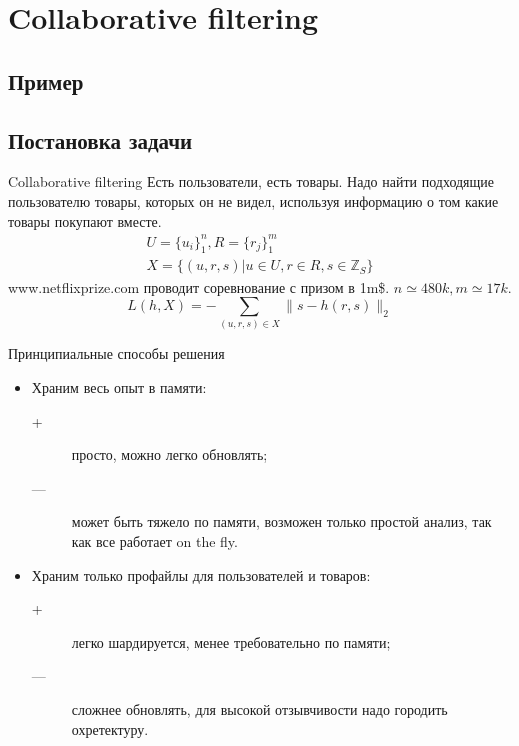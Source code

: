 \documentclass[14pt, fleqn, xcolor={dvipsnames, table}]{beamer}
\begin{document}
\section{Collaborative filtering}

\subsection{Пример}

\subsection{Постановка задачи} %
\begin{frame}{Collaborative filtering}
Есть пользователи, есть товары. Надо найти подходящие пользователю товары, которых он не видел, используя информацию о том какие товары покупают вместе.
$$\begin{array}{l}
U = \{u_i\}_1^n, R = \{r_j\}_1^m \\
X = \{(u, r, s) | u \in U, r \in R, s \in \mathbb{Z}_S \}
\end{array}$$
{\color{blue}www.netflixprize.com} проводит соревнование с призом в 1m\$. $n \simeq 480k, m \simeq 17k$.
$$
L(h, X) = -\sum_{(u,r,s) \in X} \|s - h(r,s)\|_2
$$
\end{frame}

\begin{frame}{Принципиальные способы решения}
\begin{itemize}
  \item Храним весь опыт в памяти:
  \begin{description}
    \item[\color{green}+] просто, можно легко обновлять;
    \item[\color{red}---] может быть тяжело по памяти, возможен только простой анализ, так как все работает on the fly.
  \end{description}
  \item Храним только профайлы для пользователей и товаров:
  \begin{description}
    \item[\color{green}+] легко шардируется, менее требовательно по памяти;
    \item[\color{red}---] сложнее обновлять, для высокой отзывчивости надо городить охретектуру.
  \end{description}
\end{itemize}
\end{frame}
\end{document}
